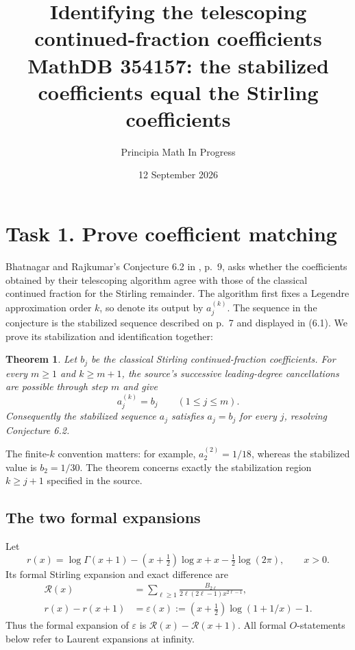 \documentclass[11pt]{article}
\title{Identifying the telescoping continued-fraction coefficients\\
\large MathDB 354157: the stabilized coefficients equal the Stirling coefficients}
\author{Principia Math In Progress}
\date{12 September 2026}
\newtheorem{theorem}{Theorem}
\begin{document}
\maketitle

\section*{Task 1. Prove coefficient matching}
Bhatnagar and Rajkumar's Conjecture 6.2 in \cite{BR}, p.~9,
asks whether the coefficients obtained by their telescoping algorithm
agree with those of the classical continued fraction for the Stirling
remainder. The algorithm first fixes a Legendre approximation order
\(k\), so denote its output by \(a_j^{(k)}\).
The sequence in the conjecture is the stabilized sequence described
on p.~7 and displayed in (6.1). We prove its stabilization and
identification together:

\begin{theorem}\label{main}
Let \(b_j\) be the classical Stirling continued-fraction coefficients.
For every \(m\geq1\) and \(k\geq m+1\), the source's successive
leading-degree cancellations are possible through step \(m\) and give
\[
 a_j^{(k)}=b_j\qquad(1\leq j\leq m).
\]
Consequently the stabilized sequence \(a_j\) satisfies \(a_j=b_j\)
for every \(j\), resolving Conjecture 6.2.
\end{theorem}

The finite-\(k\) convention matters: for example,
\(a_2^{(2)}=1/18\), whereas the stabilized value is \(b_2=1/30\).
The theorem concerns exactly the stabilization region \(k\geq j+1\)
specified in the source.

\subsection*{The two formal expansions}
Let
\[
 r(x)=\log\Gamma(x+1)-(x+\tfrac12)\log x+x-\tfrac12\log(2\pi),
 \qquad x>0.
\]
Its formal Stirling expansion and exact difference are
\begin{align}
 \mathcal R(x)&=\sum_{\ell\geq1}
 \frac{B_{2\ell}}{2\ell(2\ell-1)x^{2\ell-1}},
                                                        \label{Stirling}\\
 r(x)-r(x+1)&=\varepsilon(x):=
 (x+\tfrac12)\log(1+1/x)-1.                              \label{difference}
\end{align}
Thus the formal expansion of \(\varepsilon\) is
\(\mathcal R(x)-\mathcal R(x+1)\).
All formal \(O\)-statements below refer to Laurent expansions at infinity.
\end{document}

